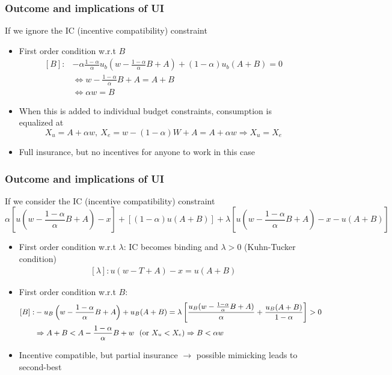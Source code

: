 \documentclass[aspectratio=169]{beamer}
\begin{document}
\begin{frame}
\frametitle{Outcome and implications of UI} 
If we ignore the IC (incentive compatibility) constraint
\begin{itemize}\setlength\itemsep{3pt}
\item First order condition w.r.t $B$
\[
\begin{aligned}
[B]:& -\alpha \frac{1-\alpha}{\alpha}u_b\left(w-\frac{1-\alpha}{\alpha}B+A \right) + (1-\alpha)u_b(A+B)=0\\
&\iff w-\frac{1-\alpha}{\alpha}B+A = A+B \\
&\iff \alpha w=B
\end{aligned}
\]
\item When this is added to individual budget constraints, consumption is equalized at
\[
X_u = A+ \alpha w, \ X_e = w-(1-\alpha)W+A = A+\alpha w \Rightarrow X_u=X_e
\]
\item Full insurance, but no incentives for anyone to work in this case
\end{itemize}
\end{frame}

\begin{frame}
\frametitle{Outcome and implications of UI} 
If we consider the IC (incentive compatibility) constraint
\[
\alpha\left[u\left(w-\frac{1-\alpha}{\alpha}B+A\right)-x\right] + [(1-\alpha)u(A+B)] +\lambda\left[u\left(w-\frac{1-\alpha}{\alpha}B+A\right)-x -u(A+B) \right]
\]
\begin{itemize}\setlength\itemsep{3pt}
\item First order condition w.r.t $\lambda$: IC becomes binding and $\lambda>0$ (Kuhn-Tucker condition)
\[
\begin{aligned}
[\lambda]:  u(w-T+A)-x = u(A+B)
\end{aligned}
\]
\item First order condition w.r.t $B$: 
\[
\begin{small}
\begin{aligned}
[B]:& -u_B\left(w-\frac{1-\alpha}{\alpha}B+A\right)+u_B(A+B)=\lambda\left[\frac{u_B(w-\frac{1-\alpha}{\alpha}B+A)}{\alpha}+\frac{u_B(A+B)}{1-\alpha}\right]>0\\
&\Rightarrow A+B < A-\frac{1-\alpha}{\alpha}B+w \ \ (\text{or } X_u<X_e)\Rightarrow B <\alpha w
\end{aligned}
\end{small}
\]
\item Incentive compatible, but partial insurance $\to$ possible mimicking leads to second-best 
\end{itemize}
\end{frame}
\end{document}
